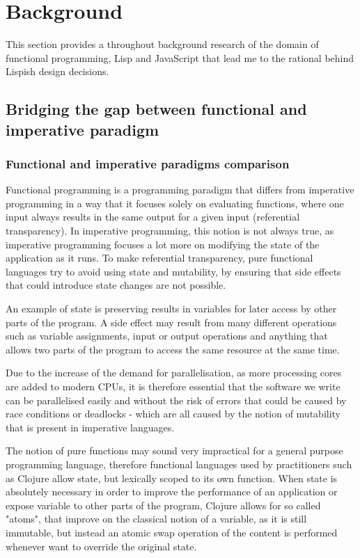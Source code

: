 \chapter{Background}
This section provides a throughout background research of the domain of functional programming, Lisp and JavaScript that lead me to the rational behind Lispish design decisions.

\section{Bridging the gap between functional and imperative paradigm}

\subsection{Functional and imperative paradigms comparison}
Functional programming is a programming paradigm that differs from imperative programming in a way that it focuses solely on evaluating functions, where one input always results in the same output for a given input (referential transparency). In imperative programming, this notion is not always true, as imperative programming focuses a lot more on modifying the state of the application as it runs. To make referential transparency, pure functional languages try to avoid using state and mutability, by ensuring that side effects that could introduce state changes are not possible.

An example of state is preserving results in variables for later access by other parts of the program. A side effect may result from many different operations such as variable assignments, input or output operations and anything that allows two parts of the program to access the same resource at the same time.

Due to the increase of the demand for parallelisation, as more processing cores are added to modern CPUs, it is therefore essential that the software we write can be parallelised easily and without the risk of errors that could be caused by race conditions or deadlocks - which are all caused by the notion of mutability that is present in imperative languages.

The notion of pure functions may sound very impractical for a general purpose programming language, therefore functional languages used by practitioners such as Clojure allow state, but lexically scoped to its own function.
When state is absolutely necessary in order to improve the performance of an application or expose variable to other parts of the program, Clojure allows for so called "atoms", that improve on the classical notion of a variable, as it is still immutable, but instead an atomic swap operation of the content is performed whenever want to override the original state.

